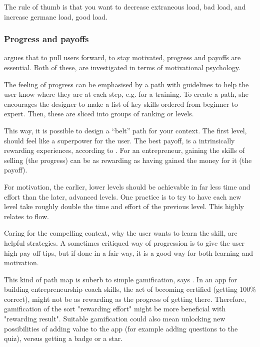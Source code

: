 The rule of thumb is that you want to decrease extraneous load, bad load, and increase germane load, good load.

\subsubsection{Progress and payoffs} \label{progress-payoffs}

\cite{sierra} argues that to pull users forward, to stay motivated, progress and payoffs are essential. Both of these, are investigated in terms of motivational psychology.

The feeling of progress can be emphasised by a path with guidelines to help the user know where they are at each step, e.g. for a training. To create a path, she encourages the designer to make a list of key skills ordered from beginner to expert. Then, these are sliced into groups of ranking or levels.

This way, it is possible to design a “belt” path for your context. The first level, should feel like a superpower for the user. The best payoff, is a intrinsically rewarding experiences, according to \cite{sierra}. For an entrepreneur, gaining the skills of selling (the progress) can be as rewarding as having gained the money for it (the payoff).

For motivation, the earlier, lower levels should be achievable in far less time and effort than the later, advanced levels. One practice is to try to have each new level take roughly double the time and effort of the previous level. This highly relates to flow.

Caring for the compelling context, why the user wants to learn the skill, are helpful strategies. A sometimes critiqued way of progression is to give the user high pay-off tips, but if done in a fair way, it is a good way for both learning and motivation.

This kind of path map is suberb to simple gamification, says \cite{sierra}. In an app for building entrepreneurship coach skills, the act of becoming certified (getting 100\% correct), might not be as rewarding as the progress of getting there. Therefore, gamification of the sort "rewarding effort" might be more beneficial with "rewarding result". Suitable gamification could also mean unlocking new possibilities of adding value to the app (for example adding questions to the quiz), versus getting a badge or a star.


